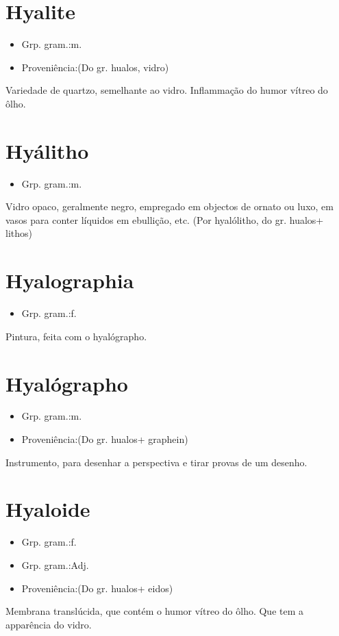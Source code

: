 \documentclass{article}
\begin{document}
\section{Hyalite}
\begin{itemize}
\item {Grp. gram.:m.}
\end{itemize}
\begin{itemize}
\item {Proveniência:(Do gr. \textunderscore hualos\textunderscore , vidro)}
\end{itemize}
Variedade de quartzo, semelhante ao vidro.
Inflammação do humor vítreo do ôlho.
\section{Hyálitho}
\begin{itemize}
\item {Grp. gram.:m.}
\end{itemize}
Vidro opaco, geralmente negro, empregado em objectos de ornato ou luxo, em vasos para conter líquidos em ebullição, etc.
(Por \textunderscore hyalólitho\textunderscore , do gr. \textunderscore hualos\textunderscore  + \textunderscore lithos\textunderscore )
\section{Hyalographia}
\begin{itemize}
\item {Grp. gram.:f.}
\end{itemize}
Pintura, feita com o hyalógrapho.
\section{Hyalógrapho}
\begin{itemize}
\item {Grp. gram.:m.}
\end{itemize}
\begin{itemize}
\item {Proveniência:(Do gr. \textunderscore hualos\textunderscore  + \textunderscore graphein\textunderscore )}
\end{itemize}
Instrumento, para desenhar a perspectiva e tirar provas de um desenho.
\section{Hyaloide}
\begin{itemize}
\item {Grp. gram.:f.}
\end{itemize}
\begin{itemize}
\item {Grp. gram.:Adj.}
\end{itemize}
\begin{itemize}
\item {Proveniência:(Do gr. \textunderscore hualos\textunderscore  + \textunderscore eidos\textunderscore )}
\end{itemize}
Membrana translúcida, que contém o humor vítreo do ôlho.
Que tem a apparência do vidro.
\end{document}
